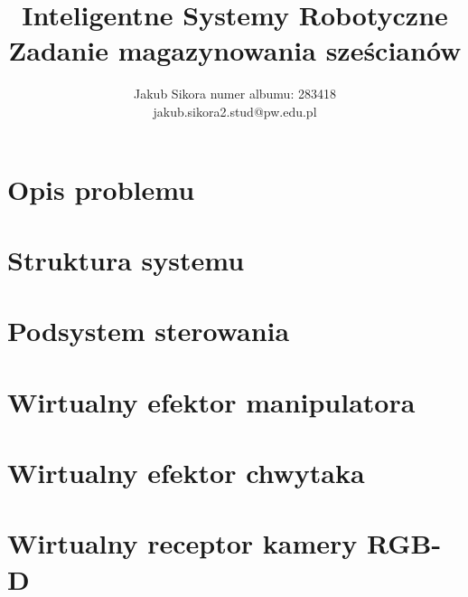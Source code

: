 \documentclass{article}
\title{Inteligentne Systemy Robotyczne \\ Zadanie magazynowania sześcianów}
\author{
Jakub Sikora
\affiliations
numer albumu: 283418 \\
\emails
jakub.sikora2.stud@pw.edu.pl
}
\begin{document}
\maketitle

\section{Opis problemu}
\label{sec:opis-problemu}


\section{Struktura systemu}
\label{sec:struktura}


\section{Podsystem sterowania}
\label{sec:cs}


\section{Wirtualny efektor manipulatora}
\label{sec:ve-manip}


\section{Wirtualny efektor chwytaka}
\label{sec:ve-gripper}


\section{Wirtualny receptor kamery RGB-D}
\label{sec:vr-camera}

\end{document}
